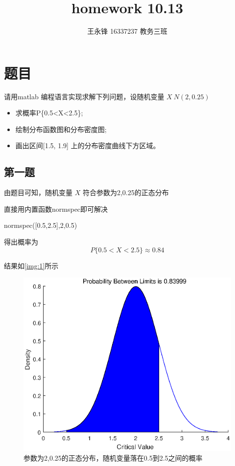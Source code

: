 \documentclass{article}
\begin{document}
\title{homework 10.13}
\author {王永锋 16337237 教务三班}
\maketitle

\section{题目}
请用matlab 编程语言实现求解下列问题，设随机变量 \( X~N(2, 0.25) \)

\begin{itemize}

\item 求概率P\{0.5<X<2.5\};
\item 绘制分布函数图和分布密度图;
\item 画出区间[1.5, 1.9] 上的分布密度曲线下方区域。

\end{itemize}

\subsection{第一题}
由题目可知，随机变量 \( X \) 符合参数为2,0.25的正态分布 \

直接用内置函数normspec即可解决

\begin{matlabcode}
    normspec([0.5,2.5],2,0.5)
\end{matlabcode}
得出概率为
\[ P\{0.5<X<2.5\} \approx 0.84 \]

\clearpage

结果如\autoref{img:1}所示
\begin{figure}[!thbp]
\includegraphics[width=.5\textwidth]{1.eps}
\centering
\caption{参数为2,0.25的正态分布，随机变量落在0.5到2.5之间的概率} 
\label{img:1}
\end{figure}
\end{document}
